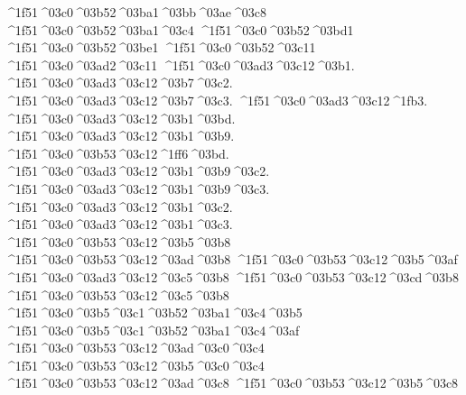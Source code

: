 {^^^^1f51^^^^03c0^^^^03b52^^^^03ba1^^^^03bb^^^^03ae^^^^03c8  		%
^^^^1f51^^^^03c0^^^^03b52^^^^03ba1^^^^03c4    		%
^^^^1f51^^^^03c0^^^^03b52^^^^03bd1
^^^^1f51^^^^03c0^^^^03b52^^^^03be1
^^^^1f51^^^^03c0^^^^03b52^^^^03c11
^^^^1f51^^^^03c0^^^^03ad2^^^^03c11
	^^^^1f51^^^^03c0^^^^03ad3^^^^03c12^^^^03b1.		%
	^^^^1f51^^^^03c0^^^^03ad3^^^^03c12^^^^03b7^^^^03c2.
	^^^^1f51^^^^03c0^^^^03ad3^^^^03c12^^^^03b7^^^^03c3.
	^^^^1f51^^^^03c0^^^^03ad3^^^^03c12^^^^1fb3.
	^^^^1f51^^^^03c0^^^^03ad3^^^^03c12^^^^03b1^^^^03bd.
	^^^^1f51^^^^03c0^^^^03ad3^^^^03c12^^^^03b1^^^^03b9.
	^^^^1f51^^^^03c0^^^^03b53^^^^03c12^^^^1ff6^^^^03bd.
	^^^^1f51^^^^03c0^^^^03ad3^^^^03c12^^^^03b1^^^^03b9^^^^03c2.
	^^^^1f51^^^^03c0^^^^03ad3^^^^03c12^^^^03b1^^^^03b9^^^^03c3.
	^^^^1f51^^^^03c0^^^^03ad3^^^^03c12^^^^03b1^^^^03c2.
	^^^^1f51^^^^03c0^^^^03ad3^^^^03c12^^^^03b1^^^^03c3. 
	^^^^1f51^^^^03c0^^^^03b53^^^^03c12^^^^03b5^^^^03b8		%
	^^^^1f51^^^^03c0^^^^03b53^^^^03c12^^^^03ad^^^^03b8
	^^^^1f51^^^^03c0^^^^03b53^^^^03c12^^^^03b5^^^^03af		%
	^^^^1f51^^^^03c0^^^^03ad3^^^^03c12^^^^03c5^^^^03b8		%
	^^^^1f51^^^^03c0^^^^03b53^^^^03c12^^^^03cd^^^^03b8
	^^^^1f51^^^^03c0^^^^03b53^^^^03c12^^^^03c5^^^^03b8		%
^^^^1f51^^^^03c0^^^^03b5^^^^03c1^^^^03b52^^^^03ba1^^^^03c4^^^^03b5 		%
^^^^1f51^^^^03c0^^^^03b5^^^^03c1^^^^03b52^^^^03ba1^^^^03c4^^^^03af 		%
	^^^^1f51^^^^03c0^^^^03b53^^^^03c12^^^^03ad^^^^03c0^^^^03c4 		%
	^^^^1f51^^^^03c0^^^^03b53^^^^03c12^^^^03b5^^^^03c0^^^^03c4
	^^^^1f51^^^^03c0^^^^03b53^^^^03c12^^^^03ad^^^^03c8
	^^^^1f51^^^^03c0^^^^03b53^^^^03c12^^^^03b5^^^^03c8
}
